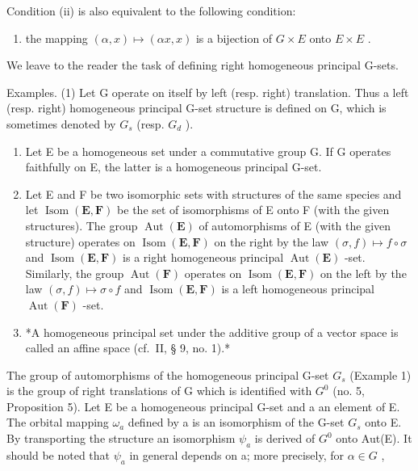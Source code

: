 Condition (ii) is also equivalent to the following condition:

\begin{enumerate}
\def\labelenumi{(\roman{enumi})}
\setcounter{enumi}{2}
\tightlist
\item
  the mapping \((\alpha, x) \mapsto (\alpha x, x)\) is a bijection of \(G \times E\) onto \(E \times E\) .
\end{enumerate}

We leave to the reader the task of defining right homogeneous principal G-sets.

Examples. (1) Let G operate on itself by left (resp. right) translation. Thus a left (resp. right) homogeneous principal G-set structure is defined on G, which is sometimes denoted by \(G_{s}\) (resp. \(G_{d}\) ).

\begin{enumerate}
\def\labelenumi{(\arabic{enumi})}
\setcounter{enumi}{1}
\item
  Let E be a homogeneous set under a commutative group G. If G operates faithfully on E, the latter is a homogeneous principal G-set.
\item
  Let E and F be two isomorphic sets with structures of the same species and let \(\operatorname{Isom}(\mathbf{E}, \mathbf{F})\) be the set of isomorphisms of E onto F (with the given structures). The group \(\operatorname{Aut}(\mathbf{E})\) of automorphisms of E (with the given structure) operates on \(\operatorname{Isom}(\mathbf{E}, \mathbf{F})\) on the right by the law \((\sigma, f) \mapsto f \circ \sigma\) and \(\operatorname{Isom}(\mathbf{E}, \mathbf{F})\) is a right homogeneous principal \(\operatorname{Aut}(\mathbf{E})\) -set. Similarly, the group \(\operatorname{Aut}(\mathbf{F})\) operates on \(\operatorname{Isom}(\mathbf{E}, \mathbf{F})\) on the left by the law \((\sigma, f) \mapsto \sigma \circ f\) and \(\operatorname{Isom}(\mathbf{E}, \mathbf{F})\) is a left homogeneous principal \(\operatorname{Aut}(\mathbf{F})\) -set.
\item
  *A homogeneous principal set under the additive group of a vector space is called an affine space (cf.~II, § 9, no. 1).*
\end{enumerate}

The group of automorphisms of the homogeneous principal G-set \(G_{s}\) (Example 1) is the group of right translations of G which is identified with \(G^{0}\) (no. 5, Proposition 5). Let E be a homogeneous principal G-set and a an element of E. The orbital mapping \(\omega_{a}\) defined by a is an isomorphism of the G-set \(G_{s}\) onto E. By transporting the structure an isomorphism \(\psi_{a}\) is derived of \(G^{0}\) onto Aut(E). It should be noted that \(\psi_{a}\) in general depends on a; more precisely, for \(\alpha \in G\) ,

